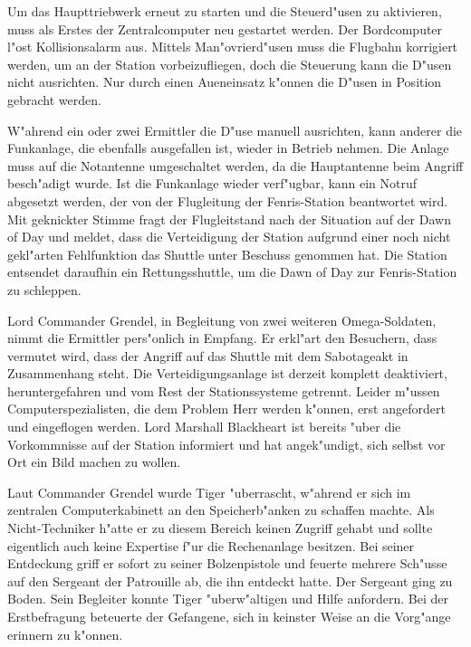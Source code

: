 Um das Haupttriebwerk erneut zu starten und die Steuerd"usen zu aktivieren, muss als Erstes der Zentralcomputer neu gestartet werden. Der Bordcomputer l"ost Kollisionsalarm aus. Mittels Man"ovrierd"usen muss die Flugbahn korrigiert werden, um an der Station vorbeizufliegen, doch die Steuerung kann die D"usen nicht ausrichten. Nur durch einen Au\3eneinsatz k"onnen die D"usen in Position gebracht werden.

W"ahrend ein oder zwei Ermittler die D"use manuell ausrichten, kann anderer die Funkanlage, die ebenfalls ausgefallen ist, wieder in Betrieb nehmen. Die Anlage muss auf die Notantenne umgeschaltet werden, da die Hauptantenne beim Angriff besch"adigt wurde. Ist die Funkanlage wieder verf"ugbar, kann ein Notruf abgesetzt werden, der von der Flugleitung der Fenris-Station beantwortet wird. Mit geknickter Stimme fragt der Flugleitstand nach der Situation auf der Dawn of Day und meldet, dass die Verteidigung der Station aufgrund einer noch nicht gekl"arten Fehlfunktion das Shuttle unter Beschuss genommen hat. Die Station entsendet daraufhin ein Rettungsshuttle, um die Dawn of Day zur Fenris-Station zu schleppen.

Lord Commander Grendel, in Begleitung von zwei weiteren Omega-Soldaten, nimmt die Ermittler pers"onlich in Empfang. Er erkl"art den Besuchern, dass vermutet wird, dass der Angriff auf das Shuttle mit dem Sabotageakt in Zusammenhang steht. Die Verteidigungsanlage ist derzeit komplett deaktiviert, heruntergefahren und vom Rest der Stationssysteme getrennt. Leider m"ussen Computerspezialisten, die dem Problem Herr werden k"onnen, erst angefordert und eingeflogen werden. Lord Marshall Blackheart ist bereits "uber die Vorkommnisse auf der Station informiert und hat angek"undigt, sich selbst vor Ort ein Bild machen zu wollen.

Laut Commander Grendel wurde Tiger "uberrascht, w"ahrend er sich im zentralen Computerkabinett an den Speicherb"anken zu schaffen machte. Als Nicht-Techniker h"atte er zu diesem Bereich keinen Zugriff gehabt und sollte eigentlich auch keine Expertise f"ur die Rechenanlage besitzen. Bei seiner Entdeckung griff er sofort zu seiner Bolzenpistole und feuerte mehrere Sch"usse auf den Sergeant der Patrouille ab, die ihn entdeckt hatte. Der Sergeant ging zu Boden. Sein Begleiter konnte Tiger "uberw"altigen und Hilfe anfordern. Bei der Erstbefragung beteuerte der Gefangene, sich in keinster Weise an die Vorg"ange erinnern zu k"onnen.

